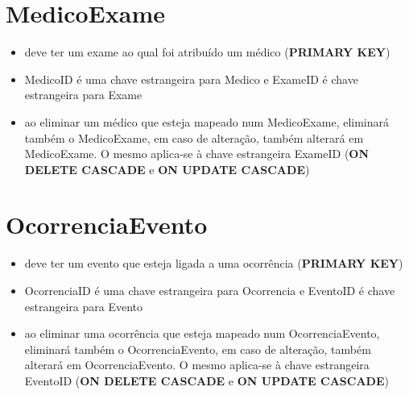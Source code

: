 \documentclass[article, a4paper, 12pt, oneside]{memoir}
\begin{document}
\section*{MedicoExame}
\begin{itemize}
	\item deve ter um exame ao qual foi atribuído um médico (\textbf{PRIMARY KEY})
	\item MedicoID é uma chave estrangeira para Medico e ExameID é chave estrangeira para Exame
	\item ao eliminar um médico que esteja mapeado num MedicoExame, eliminará também o MedicoExame, em caso de alteração, também alterará em MedicoExame. O mesmo aplica-se à chave estrangeira ExameID (\textbf{ON DELETE CASCADE} e \textbf{ON UPDATE CASCADE})
\end{itemize}

\newpage

\section*{OcorrenciaEvento}
\begin{itemize}
	\item deve ter um evento que esteja ligada a uma ocorrência (\textbf{PRIMARY KEY})
	\item OcorrenciaID é uma chave estrangeira para Ocorrencia e EventoID é chave estrangeira para Evento
	\item ao eliminar uma ocorrência que esteja mapeado num OcorrenciaEvento, eliminará também o OcorrenciaEvento, em caso de alteração, também alterará em OcorrenciaEvento. O mesmo aplica-se à chave estrangeira EventoID (\textbf{ON DELETE CASCADE} e \textbf{ON UPDATE CASCADE})
\end{itemize}
\end{document}
